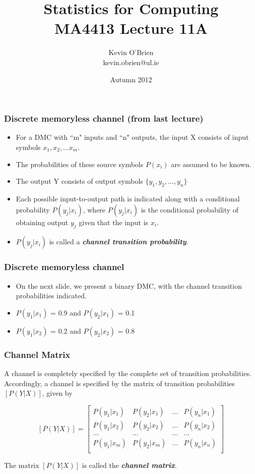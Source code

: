 \documentclass[a4]{beamer}
\title[MA4413]{Statistics for Computing \\ {\normalsize MA4413 Lecture 11A}}
\author[Kevin O'Brien]{Kevin O'Brien \\ {\scriptsize kevin.obrien@ul.ie}}
\date{Autumn 2012}
\institute[Maths \& Stats]{Dept. of Mathematics \& Statistics, \\ University \textit{of} Limerick}
\begin{document}
\begin{frame}
\titlepage
\end{frame}

\begin{frame}
\frametitle{Discrete memoryless channel (from last lecture)}
\begin{itemize}
\item For a DMC with ``m" inputs and ``n" outputs, the input X consists of input symbols $x_1, x_2, \ldots x_m$.
\item The probabilities of these source symbols $P(x_i)$ are assumed to be known.
\item The output Y consists of output symbols $\{y_1,y_2,\ldots, y_n \}$
\item Each possible input-to-output path is indicated along with a conditional probability $P(y_j|x_i)$, where $P(y_j|x_i)$  is the conditional probability of
obtaining output $y_j$ given that the input is $x_i$. \item $P(y_j|x_i)$ is called a \textbf{\emph{channel transition probability}}.
\end{itemize}
\end{frame}
\begin{frame}
\frametitle{Discrete memoryless channel}
\begin{itemize}
\item On the next slide, we present a binary DMC, with the channel transition probabilities indicated.
\item $P(y_1|x_1)$ = 0.9  and $P(y_2|x_1)$ = 0.1
\item $P(y_1|x_2)$ = 0.2  and $P(y_2|x_2)$ = 0.8
\end{itemize}
\end{frame}


\begin{frame}
\frametitle{Channel Matrix}

A channel is completely specified by the complete set of transition probabilities. Accordingly, a
channel is specified by the matrix of transition probabilities $[P(Y|X)]$, given by

\[  [P(Y|X)]  = \left[ \begin{array}{cccc}
P(y_1|x_1) & P(y_2|x_1) & \ldots & P(y_n|x_1) \\
P(y_1|x_2) & P(y_2|x_2) & \ldots & P(y_n|x_2) \\
\ldots & \ldots & \ldots & \ldots \\
P(y_1|x_m) & P(y_2|x_m) & \ldots & P(y_n|x_n) \\
\end{array} \right] \]


The matrix $[P(Y|X)]$ is called the \textbf{\emph{channel matrix}}.
 \end{frame}
\end{document}

